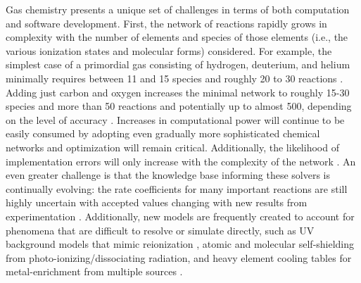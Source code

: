 Gas chemistry presents a unique set of challenges in terms of
both computation and software development.  First, the network of
reactions rapidly grows in complexity with the number of elements and
species of those elements (i.e., the various ionization states and
molecular forms) considered.  For example, the simplest case of a
primordial gas consisting of hydrogen, deuterium, and helium minimally
requires between 11 and 15 species and roughly 20 to 30 reactions
\citep{1997NewA....2..181A, 1998A&A...335..403G}.
Adding just carbon and oxygen increases the minimal network to 
roughly 15-30 species and more than 50 reactions
and potentially up to almost 500, depending on the level of
accuracy \citep{2005ApJ...626..627O, 2012MNRAS.421..116G}.  Increases in
computational power will continue to be easily consumed by adopting
even gradually more sophisticated chemical networks and optimization
will remain critical.  Additionally, the likelihood of implementation
errors will only increase with the complexity of the network
\citep{taschuk2017ten}. An even greater challenge is that the
knowledge base
informing these solvers is continually evolving: the rate
coefficients for many important reactions are still highly uncertain
\citep{2008MNRAS.388.1627G, 2011ApJ...726...55T} with accepted values
changing with new results from experimentation
\citep{2010Sci...329...69K, 2015ApJS..219....6O, 2016ApJ...816...31D}.
Additionally, new models are frequently created to account for
phenomena that are difficult to resolve or simulate directly, such as
UV background models that mimic reionization
\citep[e.g.,][]{1996ApJ...461...20H, 2001cghr.confE..64H,
2012ApJ...746..125H, 2009ApJ...703.1416F}, atomic
\citep{2013MNRAS.430.2427R} and molecular \citep{1996ApJ...468..269D,
2012MNRAS.425L..51W} self-shielding from photo-ionizing/dissociating
radiation, and heavy element cooling tables for metal-enrichment from
multiple sources \citep[e.g.,][]{2009MNRAS.393...99W,
2013MNRAS.433.3005D}.

